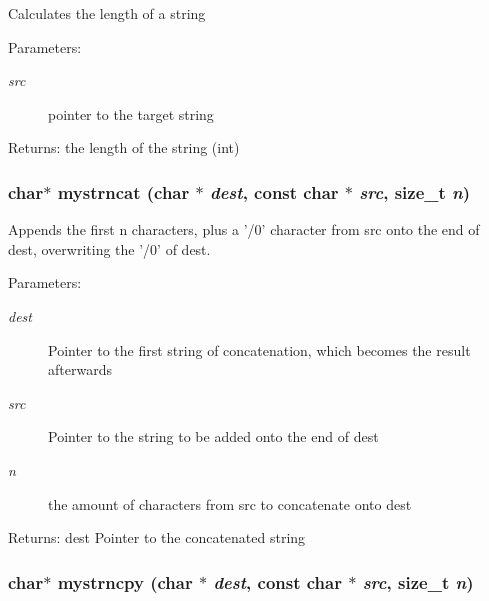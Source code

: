 Calculates the length of a string \begin{Desc}
\item[Parameters:]
\begin{description}
\item[{\em src}]pointer to the target string \end{description}
\end{Desc}
\begin{Desc}
\item[Returns:]the length of the string (int) \end{Desc}
\subsubsection{\setlength{\rightskip}{0pt plus 5cm}char$\ast$ mystrncat (char $\ast$ {\em dest}, const char $\ast$ {\em src}, size\_\-t {\em n})}\label{mystring_8h_36e5091b981e9da826d41e7977b8e507}


Appends the first n characters, plus a '/0' character from src onto the end of dest, overwriting the '/0' of dest. \begin{Desc}
\item[Parameters:]
\begin{description}
\item[{\em dest}]Pointer to the first string of concatenation, which becomes the result afterwards \item[{\em src}]Pointer to the string to be added onto the end of dest \item[{\em n}]the amount of characters from src to concatenate onto dest \end{description}
\end{Desc}
\begin{Desc}
\item[Returns:]dest Pointer to the concatenated string \end{Desc}
\subsubsection{\setlength{\rightskip}{0pt plus 5cm}char$\ast$ mystrncpy (char $\ast$ {\em dest}, const char $\ast$ {\em src}, size\_\-t {\em n})}\label{mystring_8h_86b7a78bb3914b2c6e6022b482c4a534}


